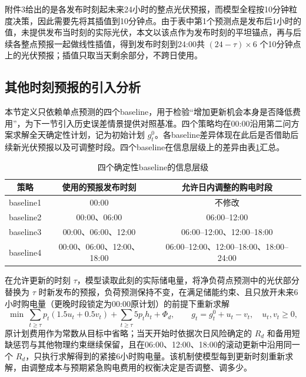 附件3给出的是各发布时刻起未来24小时的整点光伏预报，而模型全程按10分钟粒度决策，因此需要先将其插值到10分钟点。由于表中第1个预测点是发布后1小时的值，未提供发布当时刻的实际光伏，本文以该点作为发布时刻的平坦锚点，再与后续各整点预报一起做线性插值，得到发布时刻到24:00共 $(24-\tau)\times6$ 个10分钟点上的光伏预报；插值只取当天剩余部分，不跨日使用。

\subsection{其他时刻预报的引入分析}
\label{sec:q3-baseline}
本节定义只依赖单点预测的四个baseline，用于检验``增加更新机会本身是否降低费用''，为下一节引入历史误差情景提供对照基准。四个策略均在00:00沿用第二问方案求解全天确定性计划，记为初始计划 $g_t^0$。各baseline差异体现在此后是否借助后续新光伏预报以及可调整时段。四个baseline在信息层级上的差异由表\ref{tab:q3-strategy-info}汇总。

\begin{table}[H]
  \centering
  \caption{四个确定性baseline的信息层级}
  \label{tab:q3-strategy-info}
  \small
  \renewcommand{\arraystretch}{1.3}
  \begin{tabular}{|c|c|c|}
    \hline
    策略 & 使用的预报发布时刻 & 允许日内调整的购电时段 \\
    \hline
    baseline1 & 00:00 & 不修改 \\
    \hline
    baseline2 & 00:00、06:00 & 06:00--12:00 \\
    \hline
    baseline3 & 00:00、06:00、12:00 & 06:00--12:00、12:00--18:00 \\
    \hline
    baseline4 & 00:00、06:00、12:00、18:00 & 06:00--12:00、12:00--18:00、18:00--24:00 \\
    \hline
  \end{tabular}
\end{table}

在允许更新的时刻 $\tau$，模型读取此刻的实际储电量，将净负荷点预测中的光伏部分替换为 $\tau$ 时新发布的预报，负荷预测保持不变，在满足储能约束、且只放开未来6小时购电量（更晚时段锁定为00:00原计划）的前提下重新求解
\begin{equation}
\min\ \sum_{t\ge\tau}p_t(1.5u_t+0.5v_t)
+\sum_{t\ge\tau}5p_th_t+\Phi_d,
\qquad g_t=g_t^0+u_t-v_t,\quad u_t,v_t\ge0,
\end{equation}
原计划费用作为常数从目标中省略；当天开始时依据次日风险确定的 $R_d$ 和备用短缺惩罚与其他物理约束继续保留，且在06:00、12:00、18:00的滚动更新中沿用同一个 $R_d$，只执行求解得到的紧接6小时购电量。该机制使模型每到更新时刻重新求解，由调整成本与预期紧急购电费用的权衡决定是否调整、调多少。

